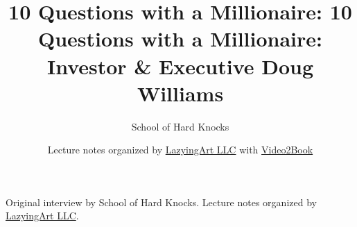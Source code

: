 \documentclass[11pt,oneside]{book}
\begin{document}
\frontmatter
\title{10 Questions with a Millionaire: 10 Questions with a Millionaire: Investor \& Executive Doug Williams}
\author{School of Hard Knocks}
\date{Lecture notes organized by \href{https://lazying.art}{LazyingArt LLC} with \href{https://github.com/lachlanchen/Video2Book}{Video2Book}}
\maketitle
\begin{center}
\small Original interview by School of Hard Knocks. Lecture notes organized by \href{https://lazying.art}{LazyingArt LLC}.
\end{center}
\clearpage
\mainmatter

\end{document}
